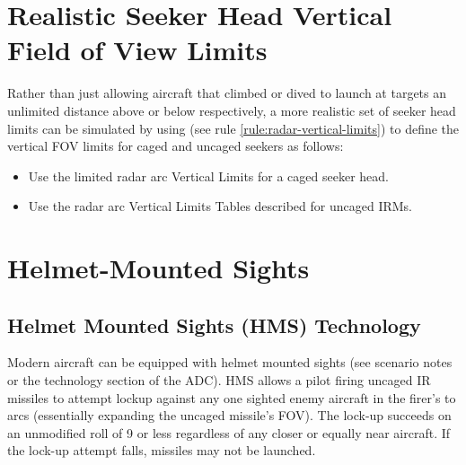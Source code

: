 \begin{advancedrules}

    \section{Realistic Seeker Head Vertical Field of View Limits}
    \label{rule:irm-realistic-vertical-limits}

    Rather than just allowing aircraft that climbed or dived to launch at targets an unlimited distance above or below respectively, a more realistic set of seeker head limits can be simulated by using  (see rule \ref{rule:radar-vertical-limits}) to define the vertical FOV limits for caged and uncaged seekers as follows:

    \begin{itemize}

        \item Use the limited radar arc Vertical Limits for a caged seeker head.

        \item Use the  radar arc Vertical Limits Tables described for uncaged IRMs.


    \end{itemize}

    \section{Helmet-Mounted Sights}
    \label{rule:irm-hms}

    \subsection{Helmet Mounted Sights (HMS) Technology} Modern aircraft can be equipped with helmet mounted sights (see scenario notes or the technology section of the ADC). HMS allows a pilot firing uncaged IR missiles to attempt lock­up against any one sighted enemy aircraft in the firer's  to  arcs (essentially expanding the uncaged missile's FOV). The lock-up succeeds on an unmodified roll of 9 or less regardless of any closer or equally near aircraft. If the lock-up attempt falls, missiles may not be launched.


\end{advancedrules}
